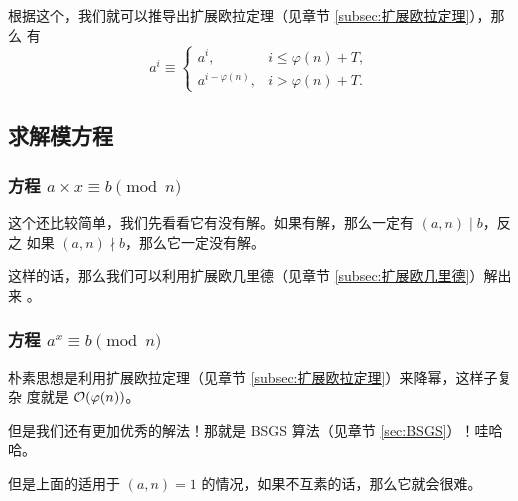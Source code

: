 根据这个，我们就可以推导出扩展欧拉定理（见章节 \ref{subsec:扩展欧拉定理}），那么
有\[
    a^i \equiv \begin{cases}
        a^i,                & i \le \varphi(n) + T, \\
        a^{i - \varphi(n)}, & i > \varphi(n) + T.
    \end{cases}
\]


\subsection{求解模方程}
\subsubsection{方程 $a \times x \equiv b \pmod n$}
这个还比较简单，我们先看看它有没有解。如果有解，那么一定有 $(a, n) \mid b$，反之
如果 $(a, n) \nmid b$，那么它一定没有解。

这样的话，那么我们可以利用扩展欧几里德（见章节 \ref{subsec:扩展欧几里德}）解出来
。

\subsubsection{方程 $a^x \equiv b \pmod n$}
朴素思想是利用扩展欧拉定理（见章节 \ref{subsec:扩展欧拉定理}）来降幂，这样子复杂
度就是 $\mathcal{O}(\varphi(n))$。

但是我们还有更加优秀的解法！那就是 BSGS 算法（见章节 \ref{sec:BSGS}）！哇哈哈。

但是上面的适用于 $(a, n) = 1$ 的情况，如果不互素的话，那么它就会很难。
